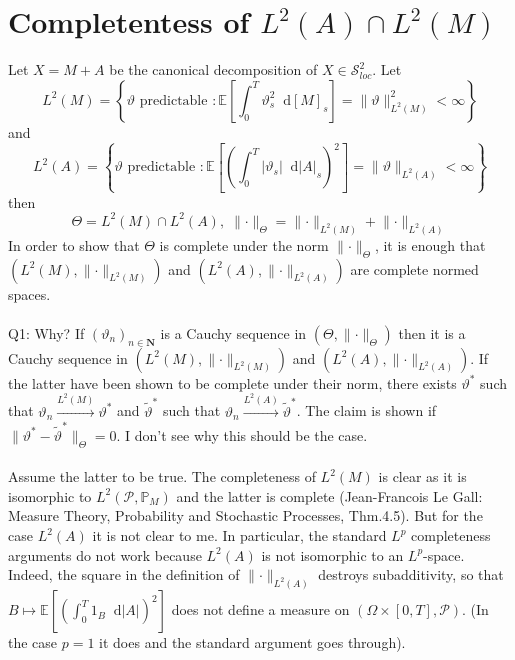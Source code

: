 \documentclass[11pt]{report}
\newcommand{\diff}{\mathop{}\!\mathrm{d}}
\theoremstyle{plain} %
\theoremstyle{definition} %
\theoremstyle{remark} %
\begin{document}
\section{Completentess of \(L^2(A)\cap L^2(M)\)}
Let \(X=M+A\) be the canonical decomposition of \(X\in\mathcal
S^2_{loc}\). Let 
\begin{equation}
    L^2(M) = \left\{\vartheta\text{ predictable }:\mathbb{E}[\int_0^T\vartheta_s^2\diff [M]_s]=\lVert\vartheta\rVert_{L^2(M)}^2<\infty \right\}
\end{equation}
 and 
 \begin{equation}
     L^2(A) = \left\{\vartheta\text{ predictable }:\mathbb{E}[\left(\int_0^T|\vartheta_s|\diff |A|_s\right)^2]=\lVert\vartheta\rVert_{L^2(A)}<\infty \right\}
 \end{equation}
 then 
 \begin{equation}
     \Theta=L^2(M)\cap L^2(A),\;\lVert\cdot\rVert_{\Theta}=\lVert\cdot\rVert_{L^2(M)}+\lVert\cdot\rVert_{L^2(A)}
 \end{equation}
 In order to show that \(\Theta\) is complete under the norm \(\lVert\cdot\rVert_{\Theta}\), it is enough that \((L^2(M),\lVert\cdot\rVert_{L^2(M)})\) and \((L^2(A),\lVert\cdot\rVert_{L^2(A)})\) are complete normed spaces. 
 \\\\
 Q1: Why? If \((\vartheta_n)_{n\in\mathbf{N}}\) is a Cauchy sequence in \((\Theta,\lVert\cdot\rVert_{\Theta})\) then it is a Cauchy sequence in \((L^2(M),\lVert\cdot\rVert_{L^2(M)})\) and \((L^2(A),\lVert\cdot\rVert_{L^2(A)})\). If the latter have been shown to be complete under their norm, there exists \(\vartheta^*\) such that \(\vartheta_n\overset{L^2(M)}{\to}\vartheta^*\) and \(\widetilde{\vartheta}^*\) such that \(\vartheta_n\overset{L^2(A)}{\to}\widetilde{\vartheta}^*\). The claim is shown if \(\lVert\vartheta^*-\widetilde{\vartheta}^*\rVert_{\Theta}=0\). I don't see why this should be the case.
 \\\\
 Assume the latter to be true. The completeness of \(L^2(M)\) is clear as it is isomorphic to \(L^2(\mathcal{P},\mathbb{P}_M)\) and the latter is complete (Jean-Francois Le Gall: Measure Theory, Probability and Stochastic Processes, Thm.4.5). But for the case \(L^2(A)\) it is not clear to me. In particular, the standard \(L^p\) completeness arguments do not work because \(L^2(A)\) is not isomorphic to an \(L^p\)-space. Indeed, the square in the definition of \(\lVert\cdot\rVert_{L^2(A)}\) destroys subadditivity, so that \(B\mapsto \mathbb{E}[\left(\int_0^T1_B\diff|A|\right)^2]\) does not define a measure on \((\Omega\times[0,T],\mathcal{P})\). (In the case \(p=1\) it does and the standard argument goes through).
\end{document}
